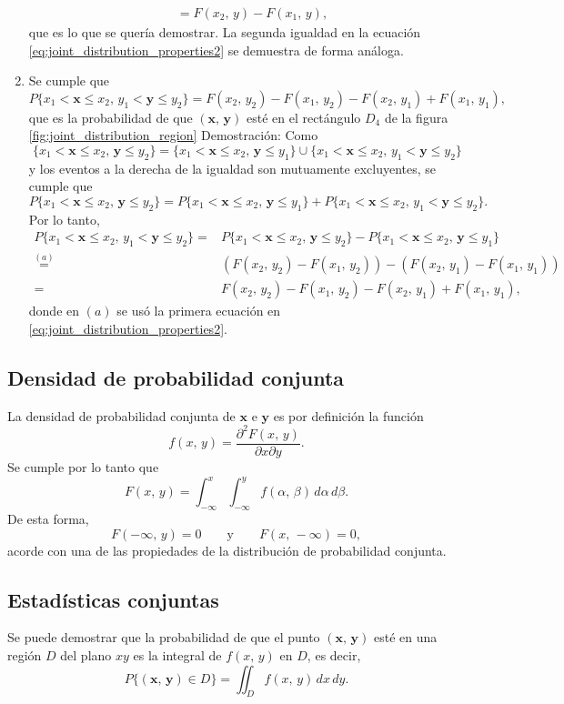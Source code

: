 \documentclass[a4paper]{report}
\newcommand{\x}{\mathbf{x}}
\newcommand{\y}{\mathbf{y}}
\begin{document}
\begin{enumerate}[1.]
\begin{align*}
   &=F(x_2,\,y)-F(x_1,\,y),
\end{align*}
que es lo que se quería demostrar. La segunda igualdad en la ecuación \ref{eq:joint_distribution_properties2} se demuestra de forma análoga.
\item Se cumple que
\begin{equation}\label{eq:joint_distribution_rectangular_region}
  P\{x_1<\x\leq x_2,\,y_1<\y\leq y_2\}=F(x_2,\,y_2)-F(x_1,\,y_2)-F(x_2,\,y_1)+F(x_1,\,y_1),
\end{equation}
que es la probabilidad de que \((\x,\,\y)\) esté en el rectángulo \(D_4\) de la figura \ref{fig:joint_distribution_region}
Demostración: Como
\[
 \{x_1<\x\leq x_2,\,\y\leq y_2\}=\{x_1<\x\leq x_2,\,\y\leq y_1\}\cup\{x_1<\x\leq x_2,\,y_1<\y\leq y_2\}
\]
y los eventos a la derecha de la igualdad son mutuamente excluyentes, se cumple que
\[
 P\{x_1<\x\leq x_2,\,\y\leq y_2\}=P\{x_1<\x\leq x_2,\,\y\leq y_1\}+P\{x_1<\x\leq x_2,\,y_1<\y\leq y_2\}.
\]
Por lo tanto,
\begin{align*}
 P\{x_1<\x\leq x_2,\,y_1<\y\leq y_2\}=&P\{x_1<\x\leq x_2,\,\y\leq y_2\}-P\{x_1<\x\leq x_2,\,\y\leq y_1\}\\
  \overset{(a)}{=}&\left(F(x_2,\,y_2)-F(x_1,\,y_2)\right)-\left(F(x_2,\,y_1)-F(x_1,\,y_1)\right)\\
  =&F(x_2,\,y_2)-F(x_1,\,y_2)-F(x_2,\,y_1)+F(x_1,\,y_1),
\end{align*}
donde en \((a)\) se usó la primera ecuación en \ref{eq:joint_distribution_properties2}.
\end{enumerate}

\subsection{Densidad de probabilidad conjunta}
La densidad de probabilidad conjunta de \(\x\) e \(\y\) es por definición la función
\begin{equation}\label{eq:joint_density_definition}
 f(x,\,y)=\frac{\partial^2F(x,\,y)}{\partial x\partial y}.
\end{equation}
Se cumple por lo tanto que
\[
 F(x,\,y)=\int_{-\infty}^{x}\int_{-\infty}^{y}f(\alpha,\,\beta)\,d\alpha\,d\beta.
\]
De esta forma,
\[
 F(-\infty,\,y)=0\qquad\textrm{y}\qquad F(x,\,-\infty)=0,
\]
acorde con una de las propiedades de la distribución de probabilidad conjunta.

\subsection{Estadísticas conjuntas}
Se puede demostrar que la probabilidad de que el punto \((\x,\,\y)\) esté en una región \(D\) del plano \(xy\) es la integral de \(f(x,\,y)\) en \(D\), es decir,
\begin{equation}\label{eq:joint_probability_definition}
 P\{(\x,\,\y)\in D\}=\iint_{D} f(x,\,y)\,dx\,dy.
\end{equation}
\end{document}
